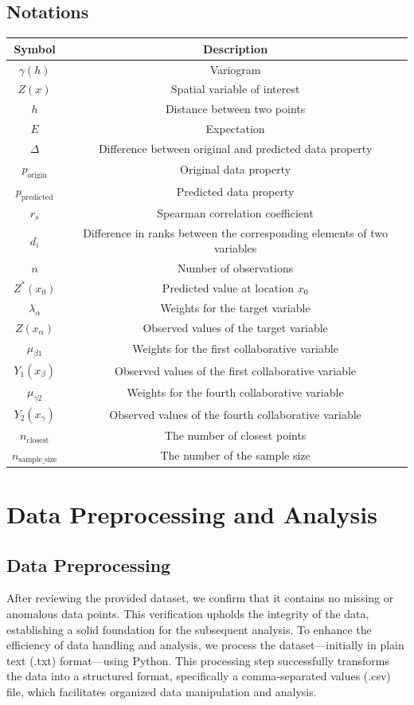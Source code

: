 \documentclass{swmcmthesis}
\begin{document}
\subsection{Notations}
\begin{table}[h!t]
\centering
\begin{tabular}{cc}
\toprule[1.5pt]
Symbol & Description\\
\midrule[1pt]
$\gamma(h)$ & Variogram \\
$Z(x)$ & Spatial variable of interest \\
$h$ & Distance between two points \\
$E$ & Expectation \\
$\Delta$ & Difference between original and predicted data property\\
$p_{\text{origin}}$ & Original data property \\
$p_{\text{predicted}}$ & Predicted data property \\
$r_s$ & Spearman correlation coefficient \\
$d_i$ & Difference in ranks between the corresponding elements of two variables \\
$n$ & Number of observations \\
$Z^*(x_0)$ & Predicted value at location \(x_0\) \\
$\lambda_\alpha$ & Weights for the target variable \\
$Z(x_\alpha)$ & Observed values of the target variable \\
$\mu_{\beta1}$ & Weights for the first collaborative variable \\
$Y_1(x_\beta)$ & Observed values of the first collaborative variable \\
$\mu_{\gamma2}$ & Weights for the fourth collaborative variable \\
$Y_2(x_\gamma)$ & Observed values of the fourth collaborative variable \\
$n_{\text{closest}}$ & The number of closest points\\
$n_\text{sample\_size}$ &The number of the sample size\\
\bottomrule[1.5pt]
\end{tabular}
\end{table}


\section{Data Preprocessing and Analysis}
\subsection{Data Preprocessing}
After reviewing the provided dataset, we confirm that it contains no missing or anomalous data points. This verification upholds the integrity of the data, establishing a solid foundation for the subsequent analysis. To enhance the efficiency of data handling and analysis, we process the dataset—initially in plain text (.txt) format—using Python. This processing step successfully transforms the data into a structured format, specifically a comma-separated values (.csv) file, which facilitates organized data manipulation and analysis.
\end{document}
